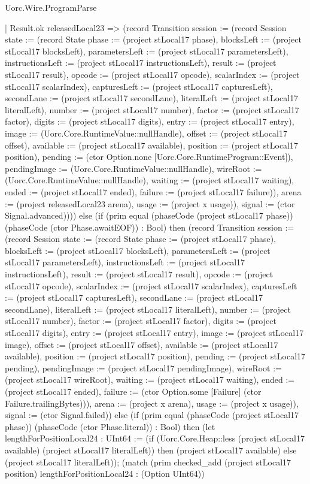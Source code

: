\begin{lexlean}{Uorc.Wire.ProgramParse}
\begin{semanticmodule}
{        | Result.ok releasedLocal23 => (record Transition {session := (record Session {state := (record State {phase := (project stLocal17 phase), blocksLeft := (project stLocal17 blocksLeft), parametersLeft := (project stLocal17 parametersLeft), instructionsLeft := (project stLocal17 instructionsLeft), result := (project stLocal17 result), opcode := (project stLocal17 opcode), scalarIndex := (project stLocal17 scalarIndex), capturesLeft := (project stLocal17 capturesLeft), secondLane := (project stLocal17 secondLane), literalLeft := (project stLocal17 literalLeft), number := (project stLocal17 number), factor := (project stLocal17 factor), digits := (project stLocal17 digits), entry := (project stLocal17 entry), image := (Uorc.Core.RuntimeValue::nullHandle), offset := (project stLocal17 offset), available := (project stLocal17 available), position := (project stLocal17 position), pending := (ctor Option.none [Uorc.Core.RuntimeProgram::Event]), pendingImage := (Uorc.Core.RuntimeValue::nullHandle), wireRoot := (Uorc.Core.RuntimeValue::nullHandle), waiting := (project stLocal17 waiting), ended := (project stLocal17 ended), failure := (project stLocal17 failure)}), arena := (project releasedLocal23 arena), usage := (project x usage)}), signal := (ctor Signal.advanced)}))) else (if (prim equal (phaseCode (project stLocal17 phase)) (phaseCode (ctor Phase.awaitEOF)) : Bool) then (record Transition {session := (record Session {state := (record State {phase := (project stLocal17 phase), blocksLeft := (project stLocal17 blocksLeft), parametersLeft := (project stLocal17 parametersLeft), instructionsLeft := (project stLocal17 instructionsLeft), result := (project stLocal17 result), opcode := (project stLocal17 opcode), scalarIndex := (project stLocal17 scalarIndex), capturesLeft := (project stLocal17 capturesLeft), secondLane := (project stLocal17 secondLane), literalLeft := (project stLocal17 literalLeft), number := (project stLocal17 number), factor := (project stLocal17 factor), digits := (project stLocal17 digits), entry := (project stLocal17 entry), image := (project stLocal17 image), offset := (project stLocal17 offset), available := (project stLocal17 available), position := (project stLocal17 position), pending := (project stLocal17 pending), pendingImage := (project stLocal17 pendingImage), wireRoot := (project stLocal17 wireRoot), waiting := (project stLocal17 waiting), ended := (project stLocal17 ended), failure := (ctor Option.some [Failure] (ctor Failure.trailingBytes))}), arena := (project x arena), usage := (project x usage)}), signal := (ctor Signal.failed)}) else (if (prim equal (phaseCode (project stLocal17 phase)) (phaseCode (ctor Phase.literal)) : Bool) then (let lengthForPositionLocal24 : UInt64 := (if (Uorc.Core.Heap::less (project stLocal17 available) (project stLocal17 literalLeft)) then (project stLocal17 available) else (project stLocal17 literalLeft)); (match (prim checked_add (project stLocal17 position) lengthForPositionLocal24 : (Option UInt64))
}
\end{semanticmodule}
\end{lexlean}
